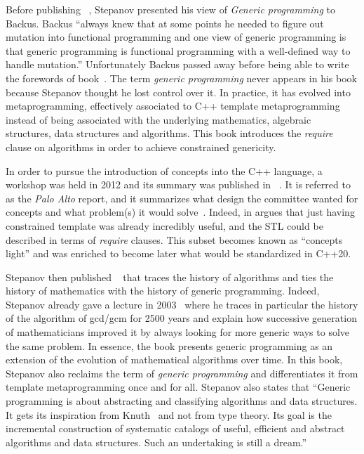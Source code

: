 Before publishing ~\parencite{stepanov.2009.elements}, Stepanov presented his view of
\emph{Generic programming} to Backus. Backus ``always knew that at some points he needed to figure out mutation into
functional programming and one view of generic programming is that generic programming is functional programming with a
well-defined way to handle mutation.'' Unfortunately Backus passed away before being able to write the forewords of
 book~\parencite{parent.2018.generic-programming}. The term \emph{generic programming}
never appears in his book because Stepanov thought he lost control over it. In practice, it has evolved into
metaprogramming, effectively associated to C++ template metaprogramming instead of being associated with the underlying
mathematics, algebraic structures, data structures and algorithms. This book introduces the \emph{require} clause on
algorithms in order to achieve constrained genericity.

In order to pursue the introduction of concepts into the C++ language, a workshop was held in 2012 and its summary was
published in ~\parencite{sutton.2012.concepts}. It is referred to as the \emph{Palo
  Alto} report, and it summarizes what design the committee wanted for concepts and what problem(s) it would
solve~\parencite{stroustrup.2012.concept}. Indeed, in  argues that just having
constrained template was already incredibly useful, and the STL could be described in terms of \emph{require} clauses.
This subset becomes known as ``concepts light'' and was enriched to become later what would be standardized in C++20.

Stepanov then published ~\parencite{stepanov.2014.mathematics} that traces the
history of algorithms and ties the history of mathematics with the history of generic programming. Indeed, Stepanov
already gave a lecture in 2003~\parencite{stepanov.2003.gcm} where he traces in particular the history of the algorithm
of gcd/gcm for 2500 years and explain how successive generation of mathematicians improved it by always looking for more
generic ways to solve the same problem. In essence, the book presents generic programming as an extension of the
evolution of mathematical algorithms over time. In this book, Stepanov also reclaims the term of \emph{generic
  programming} and differentiates it from template metaprogramming once and for all. Stepanov also states that ``Generic
programming is about abstracting and classifying algorithms and data structures. It gets its inspiration from
Knuth~\parencite{knuth.2014.art} and not from type theory. Its goal is the incremental construction of systematic
catalogs of useful, efficient and abstract algorithms and data structures. Such an undertaking is still a dream.''


